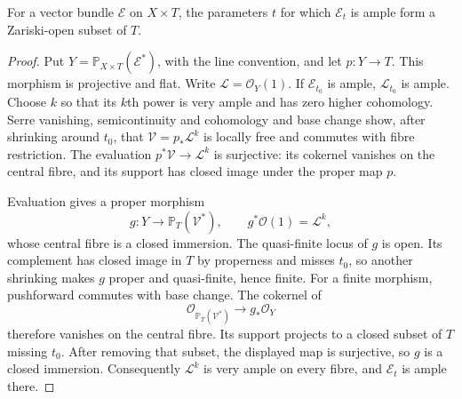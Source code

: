 \begin{lemma}\label{lem:hirzebruch-family-ample-open}
For a vector bundle $\mathcal E$ on $X\times T$, the parameters $t$
for which $\mathcal E_t$ is ample form a Zariski-open subset of $T$.
\end{lemma}
\begin{proof}
Put $Y=\mathbb P_{X\times T}(\mathcal E^*)$, with the line convention,
and let $p:Y\to T$. This morphism is projective and flat. Write
$\mathcal L=\mathcal O_Y(1)$. If $\mathcal E_{t_0}$ is ample,
$\mathcal L_{t_0}$ is ample. Choose $k$ so that its $k$th power is very
ample and has zero higher cohomology. Serre vanishing, semicontinuity and
cohomology and base change show, after shrinking around $t_0$, that
$\mathcal V=p_*\mathcal L^k$ is locally free and commutes with fibre
restriction. The evaluation $p^*\mathcal V\to\mathcal L^k$ is surjective:
its cokernel vanishes on the central fibre, and its support has closed
image under the proper map $p$.

Evaluation gives a proper morphism
\[
 g:Y\longrightarrow\mathbb P_T(\mathcal V^*),
 \qquad g^*\mathcal O(1)=\mathcal L^k,
\]
whose central fibre is a closed immersion. The quasi-finite locus of $g$
is open. Its complement has closed image in $T$ by properness and misses
$t_0$, so another shrinking makes $g$ proper and quasi-finite, hence
finite. For a finite morphism, pushforward commutes with base change.
The cokernel of
\[
 \mathcal O_{\mathbb P_T(\mathcal V^*)}\longrightarrow g_*\mathcal O_Y
\]
therefore vanishes on the central fibre. Its support projects to a closed
subset of $T$ missing $t_0$. After removing that subset, the displayed map
is surjective, so $g$ is a closed immersion. Consequently $\mathcal L^k$
is very ample on every fibre, and $\mathcal E_t$ is ample there.
\end{proof}


